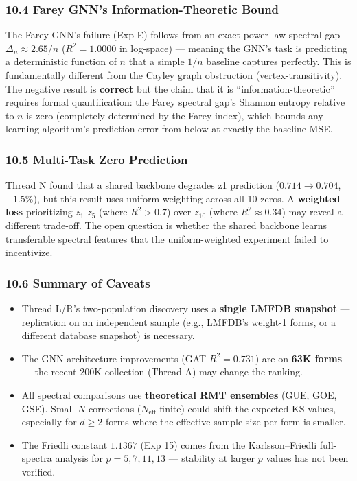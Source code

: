 \documentclass[
]{article}
\providecommand{\tightlist}{%
  \setlength{\itemsep}{0pt}\setlength{\parskip}{0pt}}
\begin{document}
\hypertarget{farey-gnns-information-theoretic-bound}{%
\subsubsection{10.4 Farey GNN's Information-Theoretic
Bound}\label{farey-gnns-information-theoretic-bound}}

The Farey GNN's failure (Exp E) follows from an exact power-law spectral
gap \(\Delta_n \approx 2.65/n\) (\(R^2 = 1.0000\) in log-space) ---
meaning the GNN's task is predicting a deterministic function of \(n\)
that a simple \(1/n\) baseline captures perfectly. This is fundamentally
different from the Cayley graph obstruction (vertex-transitivity). The
negative result is \textbf{correct} but the claim that it is
``information-theoretic'' requires formal quantification: the Farey
spectral gap's Shannon entropy relative to \(n\) is zero (completely
determined by the Farey index), which bounds any learning algorithm's
prediction error from below at exactly the baseline MSE.

\hypertarget{multi-task-zero-prediction}{%
\subsubsection{10.5 Multi-Task Zero
Prediction}\label{multi-task-zero-prediction}}

Thread N found that a shared backbone degrades z1 prediction
(\(0.714 \to 0.704\), \(-1.5\%\)), but this result uses uniform
weighting across all 10 zeros. A \textbf{weighted loss} prioritizing
\(z_1\)-\(z_5\) (where \(R^2 > 0.7\)) over \(z_{10}\) (where
\(R^2 \approx 0.34\)) may reveal a different trade-off. The open
question is whether the shared backbone learns transferable spectral
features that the uniform-weighted experiment failed to incentivize.

\hypertarget{summary-of-caveats}{%
\subsubsection{10.6 Summary of Caveats}\label{summary-of-caveats}}

\begin{itemize}
\tightlist
\item
  Thread L/R's two-population discovery uses a \textbf{single LMFDB
  snapshot} --- replication on an independent sample (e.g., LMFDB's
  weight-1 forms, or a different database snapshot) is necessary.
\item
  The GNN architecture improvements (GAT \(R^2 = 0.731\)) are on
  \textbf{63K forms} --- the recent 200K collection (Thread A) may
  change the ranking.
\item
  All spectral comparisons use \textbf{theoretical RMT ensembles} (GUE,
  GOE, GSE). Small-\(N\) corrections (\(N_{\text{eff}}\) finite) could
  shift the expected KS values, especially for \(d\ge 2\) forms where
  the effective sample size per form is smaller.
\item
  The Friedli constant \(1.1367\) (Exp 15) comes from the
  Karlsson--Friedli full-spectra analysis for \(p=5,7,11,13\) ---
  stability at larger \(p\) values has not been verified.
\end{itemize}
\end{document}

